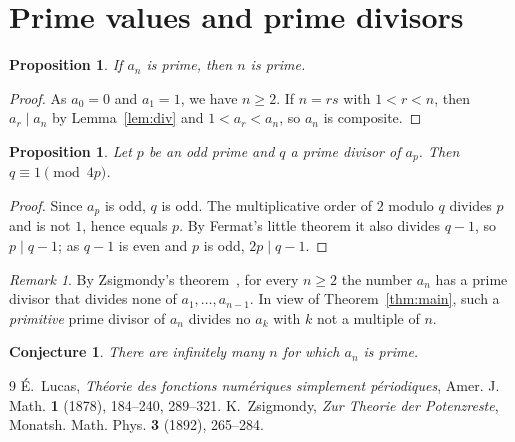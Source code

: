 \documentclass[11pt]{amsart}
\newtheorem{proposition}[theorem]{Proposition}
\newtheorem{conjecture}[theorem]{Conjecture}
\theoremstyle{definition}
\theoremstyle{remark}
\newtheorem*{remark}{Remark}
\begin{document}
\section{Prime values and prime divisors}

\begin{proposition}\label{prop:prime}
If $a_n$ is prime, then $n$ is prime.
\end{proposition}

\begin{proof}
As $a_0=0$ and $a_1=1$, we have $n\ge 2$. If $n=rs$ with $1<r<n$, then
$a_r\mid a_n$ by Lemma~\ref{lem:div} and $1<a_r<a_n$, so $a_n$ is composite.
\end{proof}

\begin{proposition}\label{prop:divisors}
Let $p$ be an odd prime and $q$ a prime divisor of $a_p$. Then
$q\equiv 1\pmod{4p}$.
\end{proposition}

\begin{proof}
Since $a_p$ is odd, $q$ is odd. The multiplicative order of $2$ modulo $q$
divides $p$ and is not $1$, hence equals $p$. By Fermat's little theorem it
also divides $q-1$, so $p\mid q-1$; as $q-1$ is even and $p$ is odd,
$2p\mid q-1$.
\end{proof}

\begin{remark}
By Zsigmondy's theorem~\cite{Zsi}, for every $n\ge 2$ the number $a_n$ has a
prime divisor that divides none of $a_1,\dots,a_{n-1}$. In view of
Theorem~\ref{thm:main}, such a \emph{primitive} prime divisor of $a_n$
divides no $a_k$ with $k$ not a multiple of $n$.
\end{remark}

\begin{conjecture}\label{conj:mersenne}
There are infinitely many $n$ for which $a_n$ is prime.
\end{conjecture}

\begin{thebibliography}{9}
 \'E.~Lucas, \emph{Th\'eorie des fonctions num\'eriques simplement
p\'eriodiques}, Amer. J. Math. \textbf{1} (1878), 184--240, 289--321.
 K.~Zsigmondy, \emph{Zur Theorie der Potenzreste}, Monatsh. Math.
Phys. \textbf{3} (1892), 265--284.
\end{thebibliography}
\end{document}
